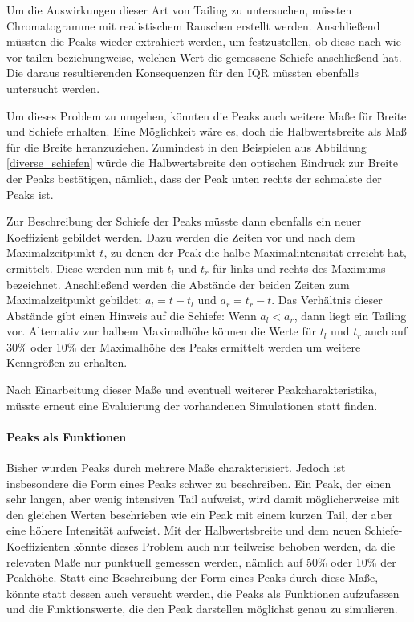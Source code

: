 Um die Auswirkungen dieser Art von Tailing zu untersuchen, müssten Chromatogramme mit realistischem Rauschen erstellt werden. Anschließend müssten die Peaks wieder extrahiert werden, um festzustellen, ob diese nach wie vor tailen beziehungweise, welchen Wert die gemessene Schiefe anschließend hat. Die daraus resultierenden Konsequenzen für den IQR müssten ebenfalls untersucht werden.

Um dieses Problem zu umgehen, könnten die Peaks auch weitere Maße für Breite und Schiefe erhalten. Eine Möglichkeit wäre es, doch die Halbwertsbreite als Maß für die Breite heranzuziehen. Zumindest in den Beispielen aus Abbildung \ref{diverse_schiefen} würde die Halbwertsbreite den optischen Eindruck zur Breite der Peaks bestätigen, nämlich, dass der Peak unten rechts der schmalste der Peaks ist. 

Zur Beschreibung der Schiefe der Peaks müsste dann ebenfalls ein neuer Koeffizient gebildet werden. Dazu werden die Zeiten vor und nach dem Maximalzeitpunkt $t$, zu denen der Peak die halbe Maximalintensität erreicht hat, ermittelt. Diese werden nun mit $t_l$ und $t_r$ für links und rechts des Maximums bezeichnet. Anschließend werden die Abstände der beiden Zeiten zum Maximalzeitpunkt gebildet: $a_l = t-t_l$ und $a_r = t_r -t$. Das Verhältnis dieser Abstände gibt einen Hinweis auf die Schiefe: Wenn $a_l < a_r$, dann liegt ein Tailing vor.
Alternativ zur halbem Maximalhöhe können die Werte für $t_l$ und $t_r$ auch auf 30\% oder 10\% der Maximalhöhe des Peaks ermittelt werden um weitere Kenngrößen zu erhalten.

Nach Einarbeitung dieser Maße und eventuell weiterer Peakcharakteristika, müsste erneut eine Evaluierung der vorhandenen Simulationen statt finden. 

\paragraph{Peaks als Funktionen}
Bisher wurden Peaks durch mehrere Maße charakterisiert. Jedoch ist insbesondere die Form eines Peaks schwer zu beschreiben. Ein Peak, der einen sehr langen, aber wenig intensiven Tail aufweist, wird damit möglicherweise mit den gleichen Werten beschrieben wie ein Peak mit einem kurzen Tail, der aber eine höhere Intensität aufweist. Mit der Halbwertsbreite und dem neuen Schiefe-Koeffizienten könnte dieses Problem auch nur teilweise behoben werden, da die relevaten Maße nur punktuell gemessen werden, nämlich auf 50\% oder 10\% der Peakhöhe. Statt eine Beschreibung der Form eines Peaks durch diese Maße, könnte statt dessen auch versucht werden, die Peaks als Funktionen aufzufassen und die Funktionswerte, die den Peak darstellen möglichst genau zu simulieren. 

